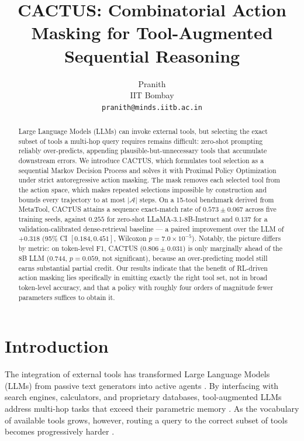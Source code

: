 \documentclass[11pt]{article}
\title{CACTUS: Combinatorial Action Masking for Tool-Augmented Sequential Reasoning}
\author{
  Pranith \\
  IIT Bombay \\
  \texttt{pranith@minds.iitb.ac.in} \\
}
\begin{document}
\maketitle

\begin{abstract}
Large Language Models (LLMs) can invoke external tools, but selecting the exact subset of tools a multi-hop query requires remains difficult: zero-shot prompting reliably over-predicts, appending plausible-but-unnecessary tools that accumulate downstream errors. We introduce CACTUS, which formulates tool selection as a sequential Markov Decision Process and solves it with Proximal Policy Optimization under strict autoregressive action masking. The mask removes each selected tool from the action space, which makes repeated selections impossible by construction and bounds every trajectory to at most $|\mathcal{A}|$ steps. On a 15-tool benchmark derived from MetaTool, CACTUS attains a sequence exact-match rate of $0.573 \pm 0.067$ across five training seeds, against $0.255$ for zero-shot LLaMA-3.1-8B-Instruct and $0.137$ for a validation-calibrated dense-retrieval baseline --- a paired improvement over the LLM of $+0.318$ (95\% CI $[0.184, 0.451]$, Wilcoxon $p = 7.0\times10^{-5}$). Notably, the picture differs by metric: on token-level F1, CACTUS ($0.806 \pm 0.031$) is only marginally ahead of the 8B LLM ($0.744$, $p = 0.059$, not significant), because an over-predicting model still earns substantial partial credit. Our results indicate that the benefit of RL-driven action masking lies specifically in emitting exactly the right tool set, not in broad token-level accuracy, and that a policy with roughly four orders of magnitude fewer parameters suffices to obtain it.
\end{abstract}

\section{Introduction}
The integration of external tools has transformed Large Language Models (LLMs) from passive text generators into active agents \cite{mialon2023augmented, karpas2022mrkl}. By interfacing with search engines, calculators, and proprietary databases, tool-augmented LLMs address multi-hop tasks that exceed their parametric memory \cite{schick2023toolformer}. As the vocabulary of available tools grows, however, routing a query to the correct subset of tools becomes progressively harder \cite{qin2023toolllm}.
\end{document}
